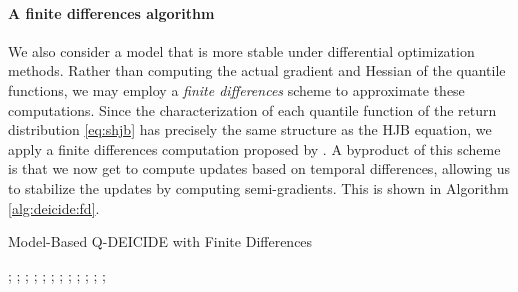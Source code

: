 \paragraph{A finite differences algorithm}
We also consider a model that is more stable under differential
optimization methods. Rather than computing the actual gradient and
Hessian of the quantile functions, we may employ a \emph{finite
  differences} scheme to approximate these computations. Since the
characterization of each quantile function of the return distribution
\eqref{eq:shjb} has precisely the same structure as the HJB
equation, we apply a finite differences computation
proposed by \citet{Munos2004ASO}. A byproduct of this scheme is that
we now get to compute updates based on temporal differences, allowing
us to stabilize the updates by computing semi-gradients. This is shown
in Algorithm \ref{alg:deicide:fd}.

\begin{algorithm}[h]
  \small
  \caption{Model-Based Q-DEICIDE with Finite Differences}\label{alg:deicide:fd}
  \begin{algorithmic}
      ; 
      ;
      ;
      ;
      ;
      ; 
      ; 
      ;
      ;
      \EndFor
      ;
      ; 
      ;
    \EndFor
  \end{algorithmic}
\end{algorithm}

